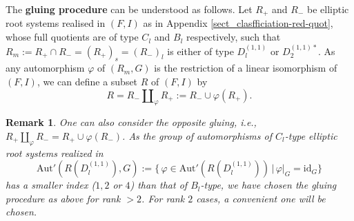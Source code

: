 \documentclass[11pt]{amsart}
\newcommand{\Aut}{\mathrm{Aut}}
\newcommand{\id}{\mathrm{id}}
\newtheorem{rem}[thm]{Remark}%
\begin{document}
\smallskip


The \textbf{gluing procedure} can be understood as follows. Let $R_+$ and $R_-$ be elliptic root systems realised in $(F,I)$ as in Appendix \ref{sect_clasfficiation-red-quot}, whose full quotients are of type $C_l$ and $B_l$ respectively, such that $R_m:=R_+ \cap R_-=(R_+)_s = (R_-)_l$ is either of type $D_l^{(1,1)}$ or $D_2^{(1,1)\ast}$. As any automorphism $\varphi$ of $(R_m,G)$ is the restriction of a linear isomorphism of $(F,I)$, we can define a subset $R$ of $(F,I)$ by
\[ R=R_- \amalg_\varphi R_+:=R_- \cup \varphi(R_+). 
\]

\begin{rem} {\rm One can also consider the opposite gluing, i.e., $R_+ \amalg_\varphi R_-=R_+ \cup \varphi(R_-)$. 
As the group of automorphisms of $C_l$-type elliptic root systems realized in 
\[ \Aut'(R(D_l^{(1,1)}),G):=\{ \, \varphi \in \Aut'(R(D_l^{(1,1)}))\, \vert \, \varphi\vert_G=\id_G\} 
\] 
has a smaller index ($1, 2$ or $4$) than that of $B_l$-type, we have chosen the gluing procedure as above for rank $>2$. For rank $2$ cases, a convenient one will be chosen. }
\end{rem}
\end{document}
